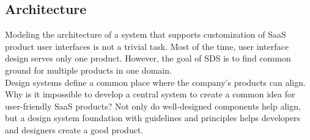 \subsection{Architecture}
Modeling the architecture of a system that supports customization of SaaS product user interfaces is not a trivial task. Most of the time, user interface design serves only one product. However, the goal of \ac{SDS} is to find common ground for multiple products in one domain. \\
Design systems define a common place where the company's products can align. Why is it impossible to develop a central system to create a common idea for user-friendly SaaS products? Not only do well-designed components help align, but a design system foundation with guidelines and principles helps developers and designers create a good product. \\

